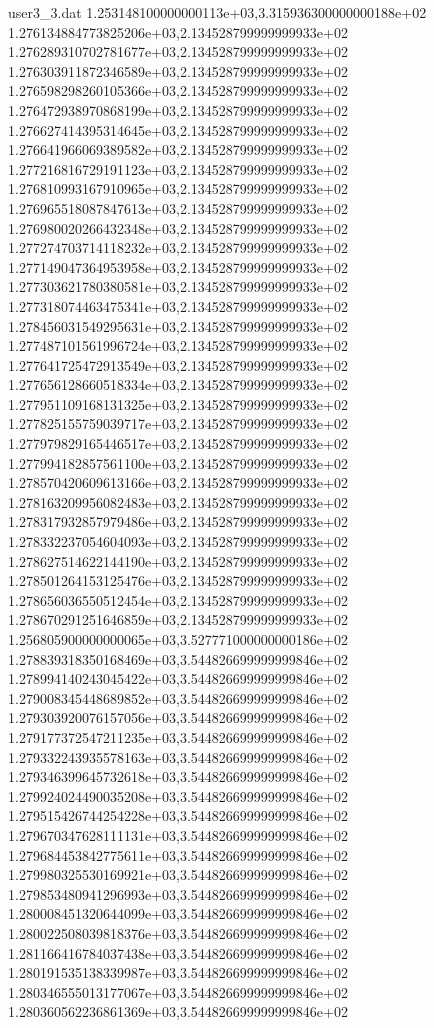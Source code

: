 \begin{filecontents}{user3_3.dat}
1.253148100000000113e+03,3.315936300000000188e+02
1.276134884773825206e+03,2.134528799999999933e+02
1.276289310702781677e+03,2.134528799999999933e+02
1.276303911872346589e+03,2.134528799999999933e+02
1.276598298260105366e+03,2.134528799999999933e+02
1.276472938970868199e+03,2.134528799999999933e+02
1.276627414395314645e+03,2.134528799999999933e+02
1.276641966069389582e+03,2.134528799999999933e+02
1.277216816729191123e+03,2.134528799999999933e+02
1.276810993167910965e+03,2.134528799999999933e+02
1.276965518087847613e+03,2.134528799999999933e+02
1.276980020266432348e+03,2.134528799999999933e+02
1.277274703714118232e+03,2.134528799999999933e+02
1.277149047364953958e+03,2.134528799999999933e+02
1.277303621780380581e+03,2.134528799999999933e+02
1.277318074463475341e+03,2.134528799999999933e+02
1.278456031549295631e+03,2.134528799999999933e+02
1.277487101561996724e+03,2.134528799999999933e+02
1.277641725472913549e+03,2.134528799999999933e+02
1.277656128660518334e+03,2.134528799999999933e+02
1.277951109168131325e+03,2.134528799999999933e+02
1.277825155759039717e+03,2.134528799999999933e+02
1.277979829165446517e+03,2.134528799999999933e+02
1.277994182857561100e+03,2.134528799999999933e+02
1.278570420609613166e+03,2.134528799999999933e+02
1.278163209956082483e+03,2.134528799999999933e+02
1.278317932857979486e+03,2.134528799999999933e+02
1.278332237054604093e+03,2.134528799999999933e+02
1.278627514622144190e+03,2.134528799999999933e+02
1.278501264153125476e+03,2.134528799999999933e+02
1.278656036550512454e+03,2.134528799999999933e+02
1.278670291251646859e+03,2.134528799999999933e+02
1.256805900000000065e+03,3.527771000000000186e+02
1.278839318350168469e+03,3.544826699999999846e+02
1.278994140243045422e+03,3.544826699999999846e+02
1.279008345448689852e+03,3.544826699999999846e+02
1.279303920076157056e+03,3.544826699999999846e+02
1.279177372547211235e+03,3.544826699999999846e+02
1.279332243935578163e+03,3.544826699999999846e+02
1.279346399645732618e+03,3.544826699999999846e+02
1.279924024490035208e+03,3.544826699999999846e+02
1.279515426744254228e+03,3.544826699999999846e+02
1.279670347628111131e+03,3.544826699999999846e+02
1.279684453842775611e+03,3.544826699999999846e+02
1.279980325530169921e+03,3.544826699999999846e+02
1.279853480941296993e+03,3.544826699999999846e+02
1.280008451320644099e+03,3.544826699999999846e+02
1.280022508039818376e+03,3.544826699999999846e+02
1.281166416784037438e+03,3.544826699999999846e+02
1.280191535138339987e+03,3.544826699999999846e+02
1.280346555013177067e+03,3.544826699999999846e+02
1.280360562236861369e+03,3.544826699999999846e+02

\end{filecontents}
